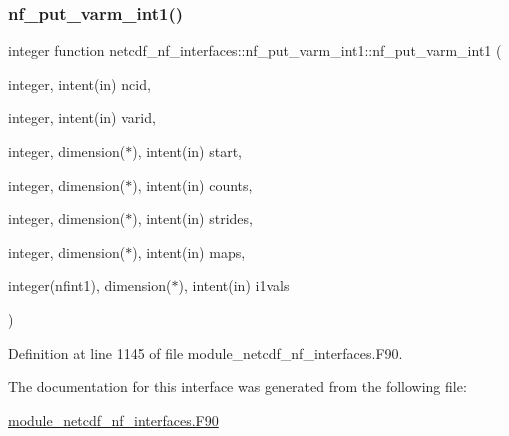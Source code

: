\subsubsection{\texorpdfstring{nf\+\_\+put\+\_\+varm\+\_\+int1()}{nf\_put\_varm\_int1()}}
{\footnotesize\ttfamily integer function netcdf\+\_\+nf\+\_\+interfaces\+::nf\+\_\+put\+\_\+varm\+\_\+int1\+::nf\+\_\+put\+\_\+varm\+\_\+int1 (\begin{DoxyParamCaption}\item[{integer, intent(in)}]{ncid,  }\item[{integer, intent(in)}]{varid,  }\item[{integer, dimension($\ast$), intent(in)}]{start,  }\item[{integer, dimension($\ast$), intent(in)}]{counts,  }\item[{integer, dimension($\ast$), intent(in)}]{strides,  }\item[{integer, dimension($\ast$), intent(in)}]{maps,  }\item[{integer(nfint1), dimension($\ast$), intent(in)}]{i1vals }\end{DoxyParamCaption})}



Definition at line 1145 of file module\+\_\+netcdf\+\_\+nf\+\_\+interfaces.\+F90.



The documentation for this interface was generated from the following file\+:\begin{DoxyCompactItemize}
\item 
\hyperlink{module__netcdf__nf__interfaces_8F90}{module\+\_\+netcdf\+\_\+nf\+\_\+interfaces.\+F90}\end{DoxyCompactItemize}
